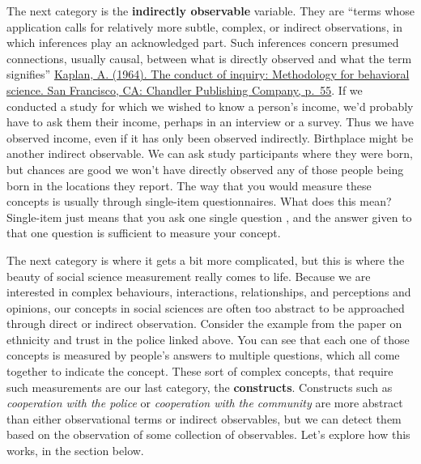 \documentclass[
]{book}
\begin{document}
The next category is the \textbf{indirectly observable} variable. They are ``terms whose application calls for relatively more subtle, complex, or indirect observations, in which inferences play an acknowledged part. Such inferences concern presumed connections, usually causal, between what is directly observed and what the term signifies'' \href{https://books.google.co.uk/books?id=wxwuDwAAQBAJ\&pg=PT89\&lpg=PT89\&dq=\%22terms+whose+application+calls+for+relatively+more+subtle,+complex,+or+indirect+observations,+in+which+inferences+play+an+acknowledged+part.+Such+inferences+concern+presumed+connections,+usually+causal,+between+what+is+directly+observed+and+what+the+term+signifies\%22\&source=bl\&ots=0_ySczx0oG\&sig=WVdwNE7mUzF_d8dfBk2R_Tq4clw\&hl=en\&sa=X\&ved=0ahUKEwihna-v5OrWAhXMYVAKHXvEBpIQ6AEIJjAA\#v=onepage\&q=\%22terms\%20whose\%20application\%20calls\%20for\%20relatively\%20more\%20subtle\%2C\%20complex\%2C\%20or\%20indirect\%20observations\%2C\%20in\%20which\%20inferences\%20play\%20an\%20acknowledged\%20part.\%20Such\%20inferences\%20concern\%20presumed\%20connections\%2C\%20usually\%20causal\%2C\%20between\%20what\%20is\%20directly\%20observed\%20and\%20what\%20the\%20term\%20signifies\%22\&f=false}{Kaplan, A. (1964). The conduct of inquiry: Methodology for behavioral science. San Francisco, CA: Chandler Publishing Company, p.~55}. If we conducted a study for which we wished to know a person's income, we'd probably have to ask them their income, perhaps in an interview or a survey. Thus we have observed income, even if it has only been observed indirectly. Birthplace might be another indirect observable. We can ask study participants where they were born, but chances are good we won't have directly observed any of those people being born in the locations they report. The way that you would measure these concepts is usually through single-item questionnaires. What does this mean? Single-item just means that you ask one single question , and the answer given to that one question is sufficient to measure your concept.

The next category is where it gets a bit more complicated, but this is where the beauty of social science measurement really comes to life. Because we are interested in complex behaviours, interactions, relationships, and perceptions and opinions, our concepts in social sciences are often too abstract to be approached through direct or indirect observation. Consider the example from the paper on ethnicity and trust in the police linked above. You can see that each one of those concepts is measured by people's answers to multiple questions, which all come together to indicate the concept. These sort of complex concepts, that require such measurements are our last category, the \textbf{constructs}. Constructs such as \emph{cooperation with the police} or \emph{cooperation with the community} are more abstract than either observational terms or indirect observables, but we can detect them based on the observation of some collection of observables. Let's explore how this works, in the section below.
\end{document}

